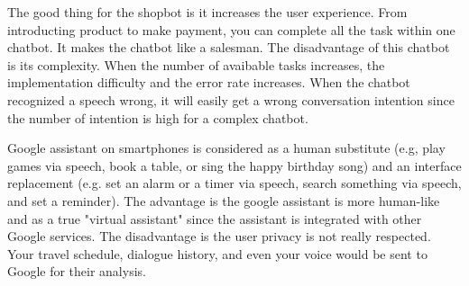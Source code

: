 \documentclass[12pt]{article}
\newenvironment{problem}[2][Problem]{\begin{trivlist}
\item[\hskip \labelsep {\bfseries #1}\hskip \labelsep {\bfseries #2.}]}{\end{trivlist}}
\begin{document}
\begin{problem}{3.2}
    The good thing for the shopbot is it increases the user experience. From 
    introducting product to make payment, you can complete all the task within 
    one chatbot. It makes the chatbot like a salesman. The disadvantage of this
    chatbot is its complexity. When the number of avaibable tasks increases, 
    the implementation difficulty and the error rate increases. When the chatbot
    recognized a speech wrong, it will easily get a wrong conversation intention
    since the number of intention is high for a complex chatbot.

    Google assistant on smartphones is considered as a human substitute 
    (e.g, play games via speech, book a table, or sing the happy birthday song) 
    and an interface replacement (e.g. set an alarm or a timer via speech, 
    search something via speech, and set a reminder). 
    The advantage is the google assistant is more human-like and as a true 
    "virtual assistant" since the assistant is integrated with other Google 
    services. 
    The disadvantage is the user privacy is not really respected. 
    Your travel schedule, dialogue history, and even your voice would be sent 
    to Google for their analysis.
\end{problem}
\end{document}

